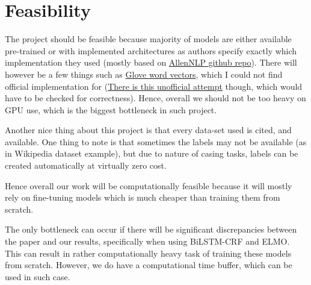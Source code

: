 \documentclass{article}
\begin{document}
\section{Feasibility}
The project should be feasible because majority of models are either available pre-trained or with implemented architectures as authors specify exactly which implementation they used (mostly based on \href{https://github.com/allenai/allennlp}{AllenNLP github repo}).
There will however be a few things such as \href{https://nlp.stanford.edu/pubs/glove.pdf}{Glove word vectors}, which I could not find official implementation for (\href{https://github.com/hans/glove.py}{There is this unofficial attempt} though, which would have to be checked for correctness). Hence, overall we should not be too heavy on GPU use, which is the biggest bottleneck in such project.

Another nice thing about this project is that every data-set used is cited, and available. One thing to note is that sometimes the labels may not be available (as in Wikipedia dataset example), but due to nature of casing tasks, labels can be created automatically at virtually zero cost.

Hence overall our work will be computationally feasible because it will mostly rely on fine-tuning models which is much cheaper than training them from scratch.

The only bottleneck can occur if there will be significant discrepancies between the paper and our results, specifically when using BiLSTM-CRF and ELMO. This can result in rather computationally heavy task of training these models from scratch. However, we do have a computational time buffer, which can be used in such case.
\end{document}
